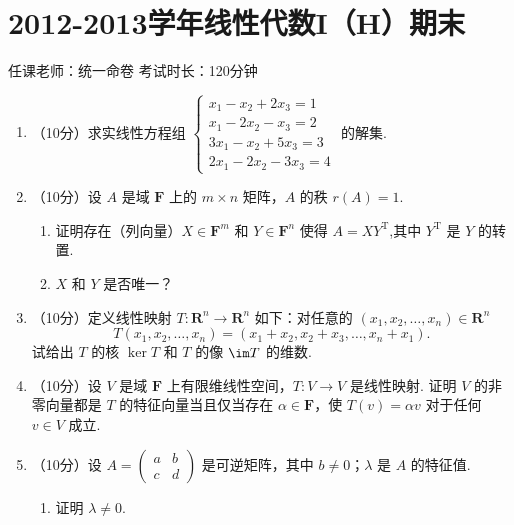 \section{2012-2013学年线性代数I（H）期末}

\begin{center}
    任课老师：统一命卷\hspace{4em} 考试时长：120分钟
\end{center}

\begin{enumerate}
    \item （10分）求实线性方程组 $\begin{cases}x_1-x_2+2x_3 = 1 \\ x_1-2x_2-x_3=2 \\ 3x_1-x_2+5x_3=3 \\ 2x_1-2x_2-3x_3 = 4\end{cases}$ 的解集.

    \item （10分）设 $A$ 是域 $\mathbf{F}$ 上的 $m\times n$ 矩阵，$A$ 的秩 $r(A)=1$.
    \begin{enumerate}
        \item 证明存在（列向量）$X\in \mathbf{F}^m$ 和 $Y\in \mathbf{F}^n$ 使得 $A=XY^\mathrm{T}$,其中 $Y^\mathrm{T}$ 是 $Y$ 的转置.

        \item $X$ 和 $Y$ 是否唯一？
    \end{enumerate}

    \item （10分）定义线性映射 $T\colon \mathbf{R}^n \to \mathbf{R}^n$ 如下：对任意的 $(x_1,x_2,\ldots,x_n) \in \mathbf{R}^n$
    \[T(x_1,x_2,\ldots,x_n)=(x_1+x_2,x_2+x_3,\ldots,x_n+x_1).\]
    试给出 $T$ 的核 $\ker T$ 和 $T$ 的像 $\im T$ 的维数.

    \item （10分）设 $V$ 是域 $\mathbf{F}$ 上有限维线性空间，$T\colon V\to V$ 是线性映射. 证明 $V$ 的非零向量都是 $T$ 的特征向量当且仅当存在 $\alpha \in \mathbf{F}$，使 $T(v)=\alpha v$ 对于任何 $v \in V$ 成立.

    \item （10分）设 $A=\begin{pmatrix}a & b \\ c & d\end{pmatrix}$ 是可逆矩阵，其中 $b\neq 0$；$\lambda$ 是 $A$ 的特征值.
    \begin{enumerate}
        \item 证明 $\lambda \neq 0$.


\end{enumerate}
\end{enumerate}
